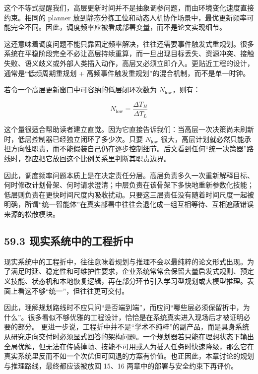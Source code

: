 这个不等式提醒我们，高层更新时间并不是抽象调参问题，而由环境变化速度直接约束。相同的 planner 放到静态分拣工位和动态人机协作场景中，最优更新频率可能完全不同。因此，调度频率应被看成部署变量，而不是论文实现细节。

这还意味着调度问题不能只靠固定频率解决，往往还需要事件触发式重规划。很多系统在平稳阶段完全不必让高层持续重算，而一旦出现目标丢失、资源冲突、接触失败、语义歧义或外部人类插入动作，高层又必须立即介入。更贴近工程的设计，通常是“低频周期重规划 + 高频事件触发重规划”的混合机制，而不是单一时钟。

若令一个高层更新窗口中可容纳的低层闭环次数为 \(N_{\text{low}}\)，则有：

\begin{equation*}
N_{\text{low}}=\frac{\Delta T_H}{\Delta T_L}
\end{equation*}

这个量很适合帮助读者建立直觉。因为它直接告诉我们：当高层一次决策尚未刷新时，低层控制器已经独立闭环了多少次。只要 \(N_{\text{low}}\) 很大，高层计划就必然只能承担方向性职责，而不能假装自己仍在逐步控制细节。后文看到任何“统一决策器”路线时，都应把它放回这个比例关系里判断其职责边界。

因此，调度频率问题本质上是在决定责任分层。高层负责多久一次重新解释目标、何时修改计划骨架、何时请求澄清；中层负责在该骨架下多快地重新参数化技能；低层则负责在更快时间尺度内吸收扰动。只要这三层责任没有随着时间尺度一起被明确，所谓“统一智能体”在真实部署中往往会退化成一组互相等待、互相遮蔽错误来源的松散模块。

\subsection*{59.3 现实系统中的工程折中}


现实系统中的工程折中，往往意味着规划与推理不会以最纯粹的论文形式出现。为了满足时延、稳定性和可维护性要求，企业系统常常会保留大量启发式规则、预定义技能、状态机和本地恢复逻辑，再在部分环节引入学习型规划或大模型推理。表面上看这不够“统一”，但往往更可交付。

因此，理解规划路线时不应只问“是否端到端”，而应问“哪些层必须保留折中，为什么”。很多看似不够优雅的工程设计，恰恰是在系统真实进入现场后才被证明必要的部分。 更进一步说，工程折中并不是“学术不纯粹”的副产品，而是具身系统从研究走向交付时必须显式回答的架构问题。一个规划器若只能在理想状态下输出全局优解，但无法在传感掉帧、技能不可用或人为插入任务时快速降级，那么它在真实系统里反而不如一个次优但可回退的方案有价值。也正因此，本章讨论的规划与推理路线，最终都应该被放回 15、16 两章中的部署与安全约束下再评价。

